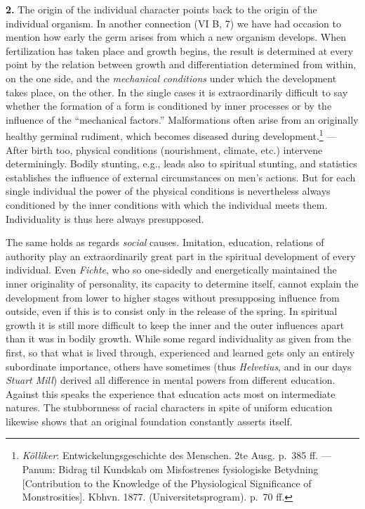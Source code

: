 \documentclass[12pt,a4paper]{book}
\newcommand{\opage}[1]{\marginnote{\footnotesize\textit{[#1]}}}
\begin{document}
\textbf{2.} The origin of the individual character points back to the
origin of the individual organism. In another connection (VI B, 7) we have
had occasion to mention how early the germ arises from which a new
organism develops. When fertilization has taken place and growth begins,
the result is determined at every point by the relation between growth and
differentiation determined from within, on the one side, and the
\emph{mechanical conditions} under which the
\opage{407}development takes place, on the other. In the single cases it
is extraordinarily difficult to say whether the formation of a form is
conditioned by inner processes or by the influence of the ``mechanical
factors.'' Malformations often arise from an originally healthy germinal
rudiment, which becomes diseased
during development.\footnote{\emph{Kölliker}: Entwickelungsgeschichte
des Menschen. 2te Ausg. p.~385 ff. --- Panum: Bidrag til Kundskab om
Misfostrenes fysiologiske Betydning [Contribution to the Knowledge of the
Physiological Significance of Monstrosities]. Kbhvn. 1877.
(Universitetsprogram). p.~70 ff.} --- After birth too, physical conditions
(nourishment, climate, etc.) intervene determiningly. Bodily stunting,
e.g., leads also to spiritual stunting, and statistics establishes the
influence of external circumstances on men's actions. But for each single
individual the power of the physical conditions is nevertheless always
conditioned by the inner conditions with which the individual meets them.
Individuality is thus here always presupposed.

The same holds as regards \emph{social} causes. Imitation, education,
relations of authority play an extraordinarily great part in the spiritual
development of every individual. Even \emph{Fichte}, who so one-sidedly
and energetically maintained the inner originality of personality, its
capacity to determine itself, cannot explain the development from lower
to higher stages without presupposing influence from outside, even if
this is to consist only in the release of the spring. In spiritual growth
it is still more difficult to keep the inner and the outer influences
apart than it was in bodily growth. While some regard individuality as
given from the first, so that what is lived through, experienced and
learned gets only an entirely subordinate importance, others have
sometimes (thus \emph{Helvetius}, and in our days \emph{Stuart Mill})
derived all difference in mental powers from different education. Against
this speaks the experience that education acts most on intermediate
natures. The stubbornness of racial characters in spite of uniform
education likewise shows that an original foundation constantly asserts
itself.
\end{document}
